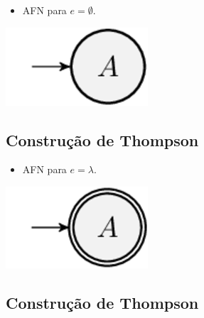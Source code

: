 \documentclass[11pt]{article}
\begin{document}
\begin{itemize}
\item AFN para \(e = \emptyset\).
\end{itemize}

\begin{center}
\includegraphics[width=.9\linewidth]{./imgs/image1.png}
\end{center}
\subsection*{Construção de Thompson}
\label{sec:orga125bd8}

\begin{itemize}
\item AFN para \(e = \lambda\).
\end{itemize}

\begin{center}
\includegraphics[width=.9\linewidth]{./imgs/image2.png}
\end{center}
\subsection*{Construção de Thompson}
\label{sec:orge0cc7b8}
\end{document}
